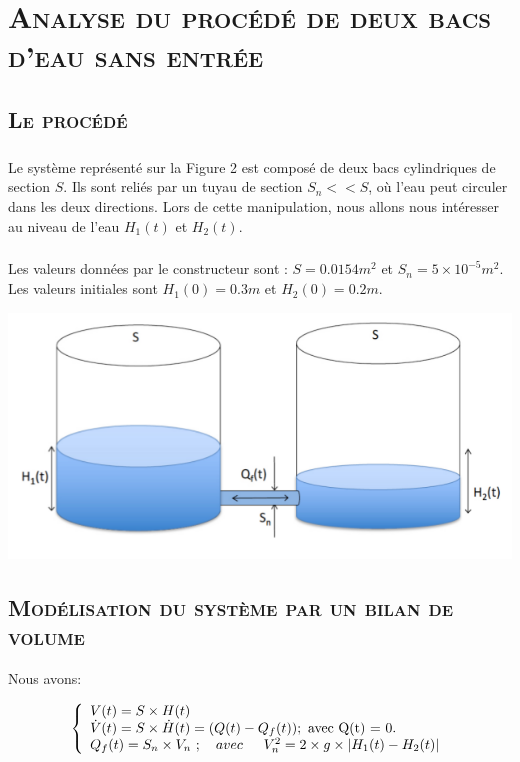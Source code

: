 \chapter{\textsc{Analyse du procédé de deux bacs d'eau sans entrée}}
\section{\textsc{Le procédé}}
 
 \paragraph{} Le système représenté sur la Figure 2 est composé de deux bacs cylindriques de section $S$. Ils sont reliés par
un tuyau de section $S_n << S$, où l’eau peut circuler dans les deux directions. Lors de cette manipulation, nous
allons nous intéresser au niveau de l’eau $H_1 (t)$ et $H_2 (t)$.

\paragraph{} Les valeurs données par le constructeur sont : $ S = 0.0154m^2 $ et $S_n = 5 \times 10^{-5}m^2 $. Les valeurs initiales sont $ H_1 (0) = 0.3m $ et $ H_2 (0) = 0.2m $.

	\begin{center}
	\includegraphics[scale=0.5]{2bac.png}
	\label{fig2} 
	\end{center}
	
\section{\textsc{Modélisation du système par un bilan de volume}}

	Nous avons:
\begin{center}
    $$\left\{
\begin{array}{l}
    V(t)=S\times H(t)\\
    \dot{V}(t)=S\times \dot{H}(t)=(Q(t)-Q_f(t)) ;\text{ avec Q(t) = $0$.}\\
    Q_f(t)=S_n \times V_n \ ; \ \ \ avec\indent  V^2_n = 2\times g\times |H_1(t)-H_2(t)| 

\end{array}
\right.$$
\end{center}


